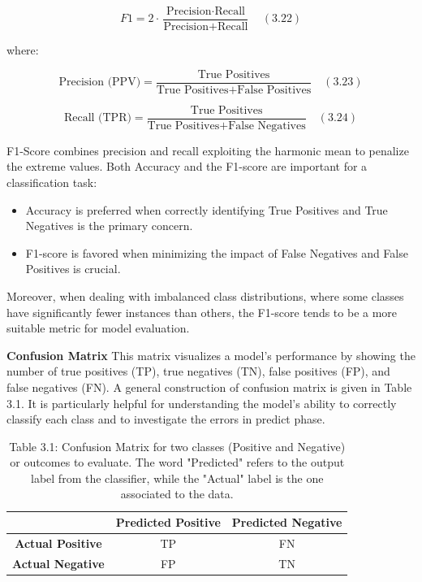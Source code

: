 \documentclass{Configuration_Files/PoliMi3i_thesis}
\begin{document}
\begin{equation}
F1 = 2 \cdot \frac{\text{Precision} \cdot \text{Recall}}{\text{Precision} + \text{Recall}} \quad (3.22)
\end{equation}

where:

\begin{equation}
\text{Precision (PPV)} = \frac{\text{True Positives}}{\text{True Positives} + \text{False Positives}} \quad (3.23)
\end{equation}

\begin{equation}
\text{Recall (TPR)} = \frac{\text{True Positives}}{\text{True Positives} + \text{False Negatives}} \quad (3.24)
\end{equation}

F1-Score combines precision and recall exploiting the harmonic mean to penalize the extreme values. Both Accuracy and the F1-score are important for a classification task:
\begin{itemize}
    \item Accuracy is preferred when correctly identifying True Positives and True Negatives is the primary concern.
    \item F1-score is favored when minimizing the impact of False Negatives and False Positives is crucial.
\end{itemize}

Moreover, when dealing with imbalanced class distributions, where some classes have significantly fewer instances than others, the F1-score tends to be a more suitable metric for model evaluation.


\textbf{Confusion Matrix} \quad This matrix visualizes a model’s performance by showing the number of true positives (TP), true negatives (TN), false positives (FP), and false negatives (FN). A general construction of confusion matrix is given in Table 3.1. It is particularly helpful for understanding the model’s ability to correctly classify each class and to investigate the errors in predict phase.

\begin{table}[h!]
\centering
\caption*{Table 3.1: Confusion Matrix for two classes (Positive and Negative) or outcomes to evaluate. The word "Predicted" refers to the output label from the classifier, while the "Actual" label is the one associated to the data.}
\begin{tabular}{|c|c|c|}
\hline
 & \textbf{Predicted Positive} & \textbf{Predicted Negative} \\
\hline
\textbf{Actual Positive} & TP & FN \\
\hline
\textbf{Actual Negative} & FP & TN \\
\hline
\end{tabular}
\end{table}
\end{document}
